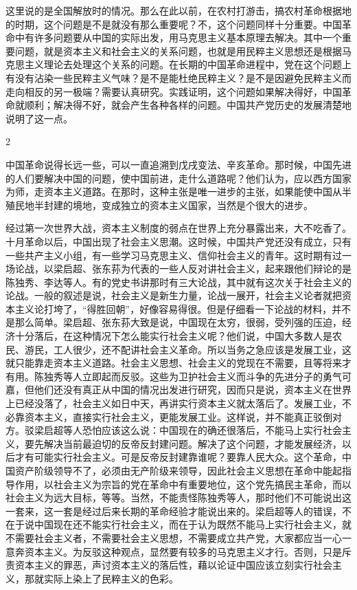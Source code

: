 \documentclass[UTF8, 12pt, a4paper]{ctexrep}
\begin{document}
这里说的是全国解放时的情况。那么在此以前，在农村打游击，搞农村革命根据地的时期，这个问题是不是就没有那么重要呢？不，这个问题同样十分重要。中国革命中有许多问题要从中国的实际出发，用马克思主义基本原理去解决。其中一个重要问题，就是资本主义和社会主义的关系问题，也就是用民粹主义思想还是根据马克思主义理论去处理这个关系的问题。在长期的中国革命进程中，党在这个问题上有没有沾染一些民粹主义气味？是不是能杜绝民粹主义？是不是因避免民粹主义而走向相反的另一极端？需要认真研究。实践证明，这个问题如果解决得好，中国革命就顺利；解决得不好，就会产生各种各样的问题。中国共产党历史的发展清楚地说明了这一点。

2

中国革命说得长远一些，可以一直追溯到戊戌变法、辛亥革命。那时候，中国先进的人们要解决中国的问题，使中国前进，走什么道路呢？他们认为，应以西方国家为师，走资本主义道路。在那时，这种主张是唯一进步的主张，如果能使中国从半殖民地半封建的境地，变成独立的资本主义国家，当然是个很大的进步。

经过第一次世界大战，资本主义制度的弱点在世界上充分暴露出来，大不吃香了。十月革命以后，中国出现了社会主义思潮。这时候，中国共产党还没有成立，只有一些共产主义小组，有一些学习马克思主义、信仰社会主义的青年。这时期有过一场论战，以梁启超、张东荪为代表的一些人反对讲社会主义，起来跟他们辩论的是陈独秀、李达等人。有的党史书讲那时有三大论战，其中就有这次关于社会主义的论战。一般的叙述是说，社会主义是新生力量，论战一展开，社会主义论者就把资本主义论打垮了，“得胜回朝”，好像容易得很。但是仔细看一下论战的材料，并不是那么简单。梁启超、张东荪大致是说，中国现在太穷，很弱，受列强的压迫，经济十分落后，在这种情况下怎么能实行社会主义呢？他们说，中国大多数人是农民、游民，工人很少，还不配讲社会主义革命。所以当务之急应该是发展工业，这就只能靠走资本主义道路。社会主义思想、社会主义的党现在不需要，且等将来才有用。陈独秀等人立即起而反驳。这些为卫护社会主义而斗争的先进分子的勇气可嘉，但他们还没有真正从中国的情况出发进行研究，因而只是说，资本主义在世界上已经没落了，社会主义如日中天，再讲实行资本主义就太落后了。发展工业，不必靠资本主义，直接实行社会主义，更能发展工业。这样说，并不能真正驳倒对方。驳梁启超等人恐怕应该这么说：中国现在的确还很落后，不能马上实行社会主义，要先解决当前最迫切的反帝反封建问题。解决了这个问题，才能发展经济，以后才有可能实行社会主义。可是反帝反封建靠谁呢？要靠人民大众。这个革命，中国资产阶级领导不了，必须由无产阶级来领导，因此社会主义思想在革命中能起指导作用，以社会主义为宗旨的党在革命中有重要地位，这个党先搞民主革命，而以社会主义为远大目标，等等。当然，不能责怪陈独秀等人，那时他们不可能说出这一套来，这一套是经过后来长期的革命经验才能说出来的。梁启超等人的错误，不在于说中国现在还不能实行社会主义，而在于认为既然不能马上实行社会主义，就不需要社会主义者，不需要社会主义思想，不需要成立共产党，大家都应当一心一意奔资本主义。为反驳这种观点，显然要有较多的马克思主义才行。否则，只是斥责资本主义的罪恶，声讨资本主义的落后性，藉以论证中国应该立刻实行社会主义，那就实际上染上了民粹主义的色彩。
\end{document}
